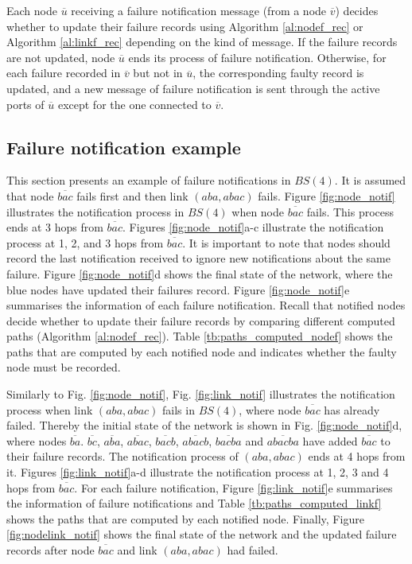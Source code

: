 Each node $\overline{u}$ receiving a failure notification message (from a node $\overline{v}$) decides whether to update their failure records using Algorithm \ref{al:nodef_rec} or Algorithm \ref{al:linkf_rec} depending on the kind of message. If the failure records are not updated, node $\overline{u}$ ends its process of failure notification. Otherwise, for each failure recorded in $\overline{v}$ but not in $\overline{u}$, the corresponding faulty record is updated, and a new message of failure notification is sent through the active ports of $\overline{u}$ except for the one connected to $\overline{v}$. 

\subsection{Failure notification example}
\label{sec:failure_not_ex}




This section presents an example of failure notifications in $BS(4)$. It is assumed that node $\overline{bac}$ fails first and then link $(aba,abac)$ fails. 
Figure \ref{fig:node_notif} illustrates the notification process in $BS(4)$ when node $\overline{bac}$ fails. This process ends at 3 hops from $\overline{bac}$. Figures \ref{fig:node_notif}a-c illustrate the notification process at 1, 2, and 3 hops from $\overline{bac}$. It is important to note that nodes should record the last notification received to ignore new notifications about the same failure. Figure \ref{fig:node_notif}d shows the final state of the network, where the blue nodes have updated their failures record. Figure \ref{fig:node_notif}e summarises the information of each failure notification. Recall that notified nodes decide whether to update their failure records by comparing different computed paths (Algorithm \ref{al:nodef_rec}). Table \ref{tb:paths_computed_nodef} shows the paths that are computed by each notified node and indicates whether the faulty node must be recorded.





Similarly to Fig. \ref{fig:node_notif}, Fig. \ref{fig:link_notif} illustrates the notification process when link $(aba,abac)$ fails in $BS(4)$, where node $\overline{bac}$ has already failed. 
Thereby the initial state of the network is shown in Fig. \ref{fig:node_notif}d, where nodes $\overline{ba}$. $\overline{bc}$, $\overline{aba}$, $\overline{abac}$, $\overline{bacb}$, $\overline{abacb}$, $\overline{bacba}$ and $\overline{abacba}$ have added $\overline{bac}$ to their failure records. The notification process of $(aba,abac)$ ends at 4 hops from it. Figures \ref{fig:link_notif}a-d illustrate the notification process at 1, 2, 3 and 4 hops from $\overline{bac}$. For each failure notification, 
Figure  \ref{fig:link_notif}e summarises the information of failure notifications and Table \ref{tb:paths_computed_linkf} shows the paths that are computed by each notified node.
Finally, Figure \ref{fig:nodelink_notif} shows the final state of the network and the updated failure records after node $\overline{bac}$ and link $(aba,abac)$ had failed.

